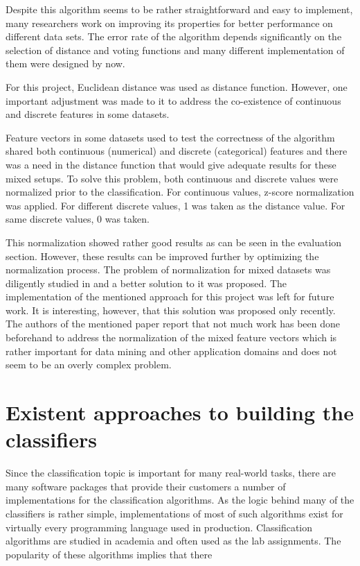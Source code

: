 \documentclass{llncs}
\begin{document}
Despite this algorithm seems to be rather straightforward and easy to implement, many researchers work on improving its properties for better performance on different data sets. The error rate of the algorithm depends significantly on the selection of distance and voting functions and many different implementation of them were designed by now.

For this project, Euclidean distance was used as distance function. However, one important adjustment was made to it to address the co-existence of continuous and discrete features in some datasets.  

Feature vectors in some datasets used to test the correctness of the algorithm shared both continuous (numerical) and discrete (categorical) features and there was a need in the distance function that would give adequate results for these mixed setups. To solve this problem, both continuous and discrete values were normalized prior to the classification. For continuous values, z-score normalization was applied. For different discrete values, 1 was taken as the distance value. For same discrete values, 0 was taken.

This normalization showed rather good results as can be seen in the evaluation section. However, these results can be improved further by optimizing the normalization process. The problem of normalization for mixed datasets was diligently studied in \cite{Suarez} and a better solution to it was proposed. The implementation of the mentioned approach for this project was left for future work. It is interesting, however, that this solution was proposed only recently. The authors of the mentioned paper report that not much work has been done beforehand to address the normalization of the mixed feature vectors which is rather important for data mining and other application domains and does not seem to be an overly complex problem.

\section{Existent approaches to building the classifiers}

Since the classification topic is important for many real-world tasks, there are many software packages that provide their customers a number of implementations for the classification algorithms. As the logic behind many of the classifiers is rather simple, implementations of most of such algorithms exist for virtually every programming language used in production. Classification algorithms are studied in academia and often used as the lab assignments. The popularity of these algorithms implies that there 
\end{document}
